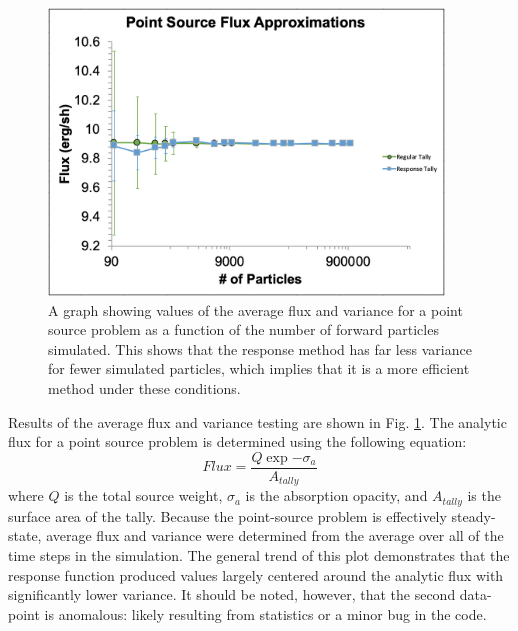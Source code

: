 \begin{figure} [h!]
	\centering
	\includegraphics[height=3in]{VarReduction/plots/point_src_errors.png}
	\caption{A graph showing values of the average flux and variance for a point source problem as a function of the number of forward particles simulated. This shows that the response method has far less variance for fewer simulated particles, which implies that it is a more efficient method under these conditions.}
	\label{fig:point_source_errors}
\end{figure}

Results of the average flux and variance testing are shown in Fig. \ref{fig:point_source_errors}. The analytic flux for a point source problem is determined using the following equation:
\begin{equation}
Flux = \frac{Q \exp{-\sigma_{a}}}{A_{tally}}
\end{equation}
where $Q$ is the total source weight, $\sigma_{a}$ is the absorption opacity, and $A_{tally}$ is the surface area of the tally. Because the point-source problem is effectively steady-state, average flux and variance were determined from the average over all of the time steps in the simulation. The general trend of this plot demonstrates that the response function produced values largely centered around the analytic flux with significantly lower variance. It should be noted, however, that the second data-point is anomalous: likely resulting from statistics or a minor bug in the code. 

